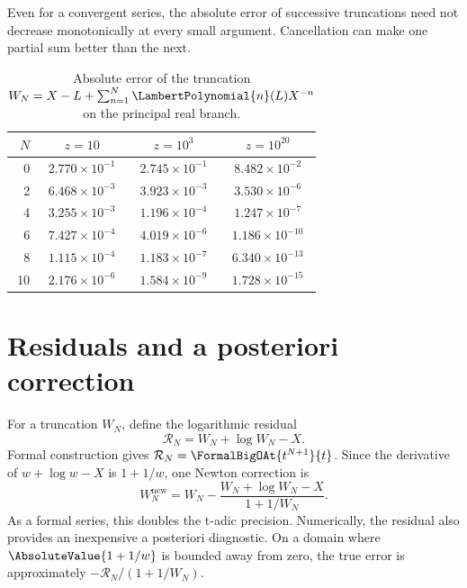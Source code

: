\documentclass[11pt,openany]{book}
\theoremstyle{definition}
\theoremstyle{plain}
\theoremstyle{remark}
\begin{document}
Even for a convergent series, the absolute error of successive truncations need
not decrease monotonically at every small argument.  Cancellation can make one
partial sum better than the next.

\begin{table}[htbp]
\centering
\caption{Absolute error of the truncation
\(W_N=X-L+\sum_{n=1}^N\LambertPolynomial{n}(L)X^{-n}\) on the principal real branch.}
\label{tab:W-errors}
\begin{tabular}{@{}rccc@{}}
\toprule
\(N\) & \(z=10\) & \(z=10^3\) & \(z=10^{20}\) \\
\midrule
0  & \(2.770\times10^{-1}\) & \(2.745\times10^{-1}\) & \(8.482\times10^{-2}\) \\
2  & \(6.468\times10^{-3}\) & \(3.923\times10^{-3}\) & \(3.530\times10^{-6}\) \\
4  & \(3.255\times10^{-3}\) & \(1.196\times10^{-4}\) & \(1.247\times10^{-7}\) \\
6  & \(7.427\times10^{-4}\) & \(4.019\times10^{-6}\) & \(1.186\times10^{-10}\) \\
8  & \(1.115\times10^{-4}\) & \(1.183\times10^{-7}\) & \(6.340\times10^{-13}\) \\
10 & \(2.176\times10^{-6}\) & \(1.584\times10^{-9}\) & \(1.728\times10^{-15}\) \\
\bottomrule
\end{tabular}
\end{table}

\section{Residuals and a posteriori correction}
For a truncation \(W_N\), define the logarithmic residual
\begin{equation}\label{eq:W-residual}
 \mathcal R_N=W_N+\log W_N-X.
\end{equation}
Formal construction gives \(\mathcal R_N=\FormalBigOAt{t^{N+1}}{t}\).  Since the derivative
of \(w+\log w-X\) is \(1+1/w\), one Newton correction is
\begin{equation}\label{eq:W-newton-correction}
 W_N^{\mathrm{new}}
 =W_N-\frac{W_N+\log W_N-X}{1+1/W_N}.
\end{equation}
As a formal series, this doubles the t-adic precision.  Numerically, the
residual also provides an inexpensive a posteriori diagnostic.  On a domain
where \(\AbsoluteValue{1+1/w}\) is bounded away from zero, the true error is approximately
\(-\mathcal R_N/(1+1/W_N)\).
\end{document}
